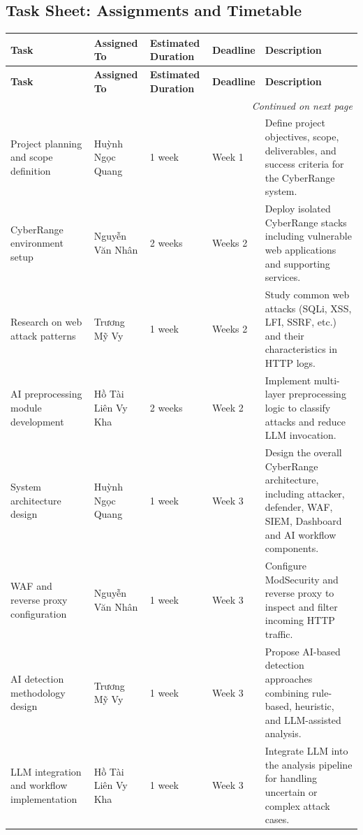 \subsection{Task Sheet: Assignments and Timetable}
\begingroup
\setlength{\LTleft}{\fill}
\setlength{\LTright}{\fill}
\setlength{\tabcolsep}{3pt}
\renewcommand{\arraystretch}{1.1}
\small
\begin{longtable}{|p{3.0cm}|p{2.4cm}|p{1.9cm}|p{1.6cm}|p{4.4cm}|}
	\hline
	\textbf{Task} & \textbf{Assigned To} & \textbf{Estimated Duration} & \textbf{Deadline} & \textbf{Description} \\
	\hline
	\endfirsthead
	\hline
	\textbf{Task} & \textbf{Assigned To} & \textbf{Estimated Duration} & \textbf{Deadline} & \textbf{Description} \\
	\hline
	\endhead
	\hline
	\multicolumn{5}{r}{\textit{Continued on next page}} \\
	\endfoot
	\endlastfoot
	Project planning and scope definition & Huỳnh Ngọc Quang & 1 week & Week 1 & Define project objectives, scope, deliverables, and success criteria for the CyberRange system. \\
	\hline
	CyberRange environment setup & Nguyễn Văn Nhân & 2 weeks & Weeks 2 & Deploy isolated CyberRange stacks including vulnerable web applications and supporting services. \\
	\hline
	Research on web attack patterns & Trương Mỹ Vy & 1 week & Weeks 2 & Study common web attacks (SQLi, XSS, LFI, SSRF, etc.) and their characteristics in HTTP logs. \\
	\hline
	AI preprocessing module development & Hồ Tài Liên Vy Kha & 2 weeks & Week 2 & Implement multi-layer preprocessing logic to classify attacks and reduce LLM invocation. \\
	\hline
	System architecture design & Huỳnh Ngọc Quang & 1 week & Week 3 & Design the overall CyberRange architecture, including attacker, defender, WAF, SIEM, Dashboard and AI workflow components. \\
	\hline
	WAF and reverse proxy configuration & Nguyễn Văn Nhân & 1 week & Week 3 & Configure ModSecurity and reverse proxy to inspect and filter incoming HTTP traffic. \\
	\hline
	AI detection methodology design & Trương Mỹ Vy & 1 week & Week 3 & Propose AI-based detection approaches combining rule-based, heuristic, and LLM-assisted analysis. \\
	\hline
	LLM integration and workflow implementation & Hồ Tài Liên Vy Kha & 1 week & Week 3 & Integrate LLM into the analysis pipeline for handling uncertain or complex attack cases. \\

\end{longtable}

